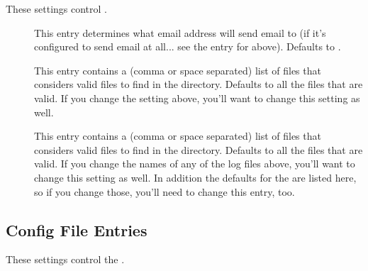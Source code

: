 These settings control .

\begin{description}

\item[] \label{param:PreenAdmin}  This entry
  determines what email address  will send email to (if
  it's configured to send email at all... see the entry for
   above).  Defaults to .

\item[] \label{param:ValidSpoolFiles}  This
  entry contains a (comma or space separated) list of files that
   considers valid files to find in the 
  directory.  Defaults to all the files that are valid.  If you change
  the  setting above, you'll want to change this
  setting as well.
  
\item[] \label{param:ValidLogFiles} This
  entry contains a (comma or space separated) list of files that
   considers valid files to find in the 
  directory.  Defaults to all the files that are valid.  If you change
  the names of any of the log files above, you'll want to change this
  setting as well.  In addition the defaults for the
   are listed here, so if you change
  those, you'll need to change this entry, too.

\end{description}


\subsection{ Config File Entries}
\label{sec:Collector-Config-File-Entries}

These settings control the .

